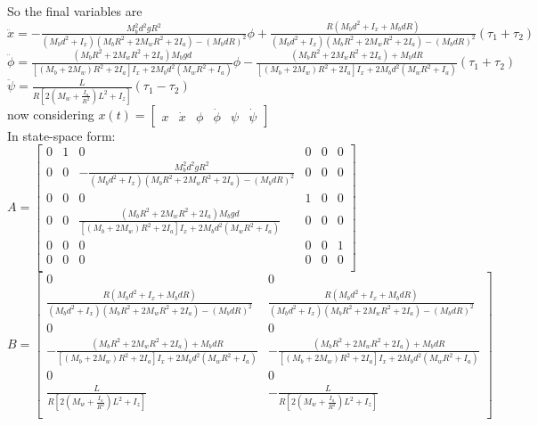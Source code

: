 \documentclass[a4paper,12pt]{article}
\begin{document}
So the final variables are \\
    $\ddot{x}=-\frac{M_b^2d^2gR^2}{\left(M_bd^2+I_x\right)\left(M_bR^2+2M_wR^2+2I_a\right)-\left(M_bdR\right)^2}\phi+\frac{R\left(M_bd^2+I_x+M_bdR\right)}{\left(M_bd^2+I_x\right)\left(M_bR^2+2M_wR^2+2I_a\right)-\left(M_bdR\right)^2}\left(\tau_1+\tau_2\right)$\\
    $\ddot{\phi}=\frac{\left(M_bR^2+2M_wR^2+2I_a\right)M_bgd}{\left[\left(M_b+2M_w\right)R^2+2I_a\right]I_x+2M_bd^2\left(M_wR^2+I_a\right)}\phi-\frac{\left(M_bR^2+2M_wR^2+2I_a\right)+M_bdR}{\left[\left(M_b+2M_w\right)R^2+2I_a\right]I_x+2M_bd^2\left(M_wR^2+I_a\right)}\left(\tau_1+\tau_2\right)$\\
    $\ddot{\psi}=\frac{L}{R\left[2\left(M_w+\frac{I_a}{R^2}\right)L^2+I_z\right]}\left(\tau_1-\tau_2\right)$\\
now considering $x(t)=\begin{bmatrix}x&\dot{x}&\phi&\dot{\phi}&\psi&\dot{\psi}\end{bmatrix}$\\
In state-space form:
$
A=\begin{bmatrix}
0&1&0&0&0&0\\
0&0&-\frac{M_b^2d^2gR^2}{\left(M_bd^2+I_x\right)\left(M_bR^2+2M_wR^2+2I_a\right)-\left(M_bdR\right)^2}&0&0&0\\
0&0&0&1&0&0\\
0&0&\frac{\left(M_bR^2+2M_wR^2+2I_a\right)M_bgd}{\left[\left(M_b+2M_w\right)R^2+2I_a\right]I_x+2M_bd^2\left(M_wR^2+I_a\right)}&0&0&0\\
0&0&0&0&0&1\\
0&0&0&0&0&0\\
\end{bmatrix}$
\\
$
B=\begin{bmatrix}
0&0\\
\frac{R\left(M_bd^2+I_x+M_bdR\right)}{\left(M_bd^2+I_x\right)\left(M_bR^2+2M_wR^2+2I_a\right)-\left(M_bdR\right)^2}&\frac{R\left(M_bd^2+I_x+M_bdR\right)}{\left(M_bd^2+I_x\right)\left(M_bR^2+2M_wR^2+2I_a\right)-\left(M_bdR\right)^2}\\
0&0\\
-\frac{\left(M_bR^2+2M_wR^2+2I_a\right)+M_bdR}{\left[\left(M_b+2M_w\right)R^2+2I_a\right]I_x+2M_bd^2\left(M_wR^2+I_a\right)}&-\frac{\left(M_bR^2+2M_wR^2+2I_a\right)+M_bdR}{\left[\left(M_b+2M_w\right)R^2+2I_a\right]I_x+2M_bd^2\left(M_wR^2+I_a\right)}\\
0&0\\
\frac{L}{R\left[2\left(M_w+\frac{I_a}{R^2}\right)L^2+I_z\right]}&-\frac{L}{R\left[2\left(M_w+\frac{I_a}{R^2}\right)L^2+I_z\right]}\\
\end{bmatrix}
$
\end{document}
